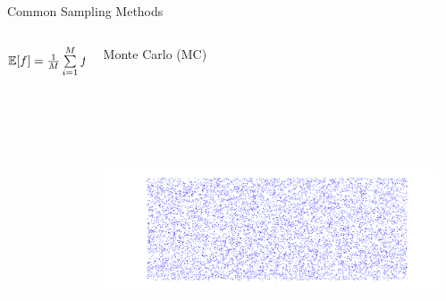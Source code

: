 \documentclass[final]{beamer}
\newcommand{\E}{\ensuremath{\mathbb{E}} } %
\newcommand {\bxi} {\mbox{\boldmath $\xi$}}%
\begin{document}
\begin{frame}{}
{\begin{columns}[t]
\begin{column}{.30\linewidth}
 \end{column}
                        
        
        
\begin{column}{.30\linewidth}

\begin{block}{\centering Common Sampling Methods}

\begin{columns}[T]

\begin{column}{10cm}{}
\centering
\vspace{3cm}
$\E[f] = \frac{1}{M}  \sum\limits_{i=1}^M f(\bxi_i)$
\end{column}

\begin{column}{12cm}{\centering \scriptsize{Monte Carlo (MC)}}
\centering\includegraphics[height=10cm, width = 10cm]{figures/MCpoints}
\end{column}


\end{columns}
\end{block}
\end{column}
\end{columns}}
\end{frame}
\end{document}
